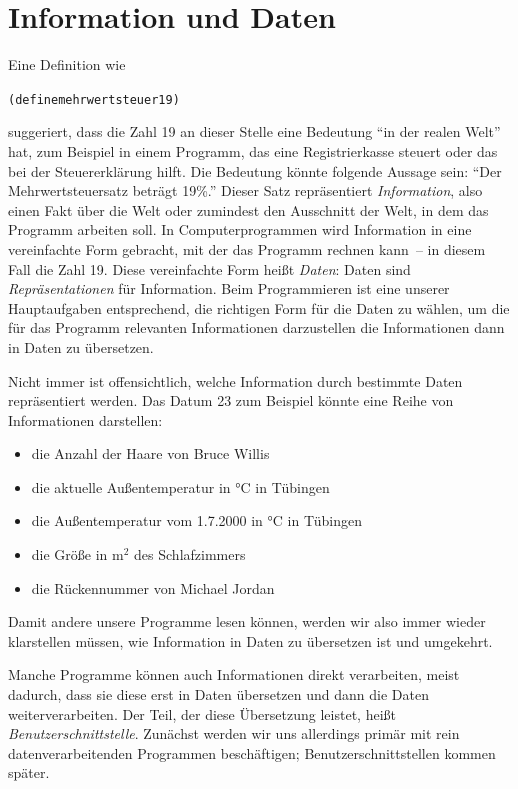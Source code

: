\section{Information und Daten}

Eine Definition wie
%
\begin{alltt}
(define mehrwertsteuer 19)
\end{alltt}
%
suggeriert, dass die Zahl 19 an dieser Stelle eine Bedeutung "`in der
realen Welt"' hat, zum Beispiel in einem Programm, das eine Registrierkasse
steuert oder das bei der Steuererklärung hilft.  Die Bedeutung könnte
folgende Aussage sein: "`Der Mehrwertsteuersatz beträgt 19\%."'
Dieser Satz repräsentiert \textit{Information},
also einen Fakt über die Welt oder zumindest den Ausschnitt der Welt, in
dem das Programm arbeiten soll.  In Computerprogrammen wird
Information in eine vereinfachte Form gebracht, mit der das Programm
rechnen kann~-- in diesem Fall die Zahl 19.  Diese vereinfachte Form
heißt \textit{Daten}: Daten sind
\textit{Repräsentationen} für Information.
Beim Programmieren ist eine
unserer Hauptaufgaben entsprechend, die richtigen Form für die Daten
zu wählen, um die für das Programm relevanten Informationen
darzustellen die Informationen dann in Daten zu übersetzen.

Nicht immer ist offensichtlich, welche Information durch bestimmte
Daten repräsentiert werden.  Das Datum 23 zum Beispiel könnte eine Reihe
von Informationen darstellen:
%
\begin{itemize}
\item die Anzahl der Haare von Bruce Willis
\item die aktuelle Außentemperatur in °C in Tübingen
\item die Außentemperatur vom 1.7.2000 in °C in Tübingen
\item die Größe in m$^2$ des Schlafzimmers
\item die Rückennummer von Michael Jordan
\end{itemize}
%
Damit andere unsere Programme lesen können, werden wir also immer
wieder klarstellen müssen, wie Information in Daten zu übersetzen ist
und umgekehrt.

Manche Programme können auch Informationen direkt verarbeiten, meist
dadurch, dass sie diese erst in Daten übersetzen und dann die Daten
weiterverarbeiten.  Der Teil, der diese Übersetzung leistet, heißt
\textit{Benutzerschnittstelle}.  Zunächst
werden wir uns allerdings primär mit rein datenverarbeitenden
Programmen beschäftigen; Benutzerschnittstellen kommen später.

